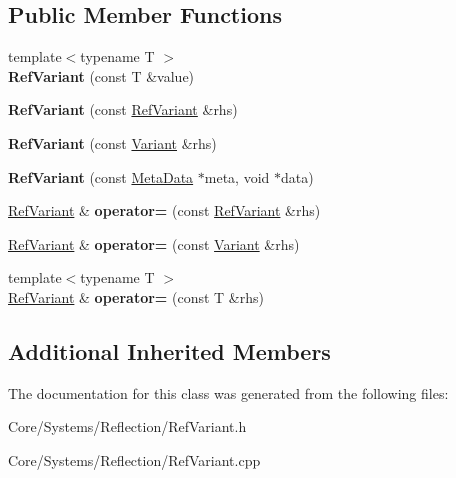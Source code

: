 \subsection*{Public Member Functions}
\begin{DoxyCompactItemize}
\item 
\hypertarget{classDCEngine_1_1RefVariant_a7d4dff789444ced8e78ad8ef119102b7}{{\footnotesize template$<$typename T $>$ }\\{\bfseries Ref\-Variant} (const T \&value)}\label{classDCEngine_1_1RefVariant_a7d4dff789444ced8e78ad8ef119102b7}

\item 
\hypertarget{classDCEngine_1_1RefVariant_aa462a5bf41a4e11f33da8c458ccd26c9}{{\bfseries Ref\-Variant} (const \hyperlink{classDCEngine_1_1RefVariant}{Ref\-Variant} \&rhs)}\label{classDCEngine_1_1RefVariant_aa462a5bf41a4e11f33da8c458ccd26c9}

\item 
\hypertarget{classDCEngine_1_1RefVariant_a177ad5eac2d1f6b3769f3bb846ee3b2f}{{\bfseries Ref\-Variant} (const \hyperlink{classDCEngine_1_1Variant}{Variant} \&rhs)}\label{classDCEngine_1_1RefVariant_a177ad5eac2d1f6b3769f3bb846ee3b2f}

\item 
\hypertarget{classDCEngine_1_1RefVariant_ae13cd5866faac1375619478794b7e52e}{{\bfseries Ref\-Variant} (const \hyperlink{classDCEngine_1_1MetaData}{Meta\-Data} $\ast$meta, void $\ast$data)}\label{classDCEngine_1_1RefVariant_ae13cd5866faac1375619478794b7e52e}

\item 
\hypertarget{classDCEngine_1_1RefVariant_a31dffdecb4a24fe933d8957b71c3ebfa}{\hyperlink{classDCEngine_1_1RefVariant}{Ref\-Variant} \& {\bfseries operator=} (const \hyperlink{classDCEngine_1_1RefVariant}{Ref\-Variant} \&rhs)}\label{classDCEngine_1_1RefVariant_a31dffdecb4a24fe933d8957b71c3ebfa}

\item 
\hypertarget{classDCEngine_1_1RefVariant_a9f05b48a1d5652a96b46d753097daade}{\hyperlink{classDCEngine_1_1RefVariant}{Ref\-Variant} \& {\bfseries operator=} (const \hyperlink{classDCEngine_1_1Variant}{Variant} \&rhs)}\label{classDCEngine_1_1RefVariant_a9f05b48a1d5652a96b46d753097daade}

\item 
\hypertarget{classDCEngine_1_1RefVariant_a2c608c3ca377cef1eece1a8b945ebd80}{{\footnotesize template$<$typename T $>$ }\\\hyperlink{classDCEngine_1_1RefVariant}{Ref\-Variant} \& {\bfseries operator=} (const T \&rhs)}\label{classDCEngine_1_1RefVariant_a2c608c3ca377cef1eece1a8b945ebd80}

\end{DoxyCompactItemize}
\subsection*{Additional Inherited Members}


The documentation for this class was generated from the following files\-:\begin{DoxyCompactItemize}
\item 
Core/\-Systems/\-Reflection/Ref\-Variant.\-h\item 
Core/\-Systems/\-Reflection/Ref\-Variant.\-cpp\end{DoxyCompactItemize}
